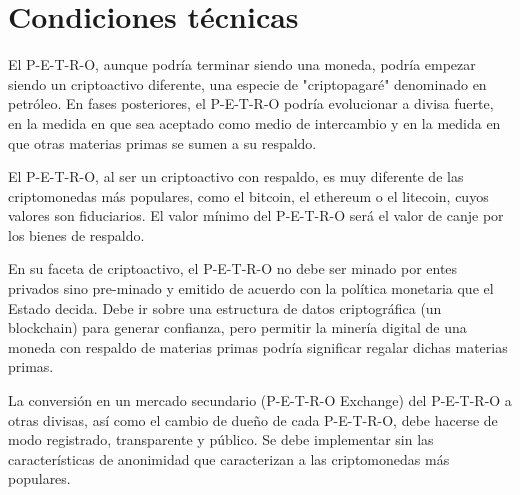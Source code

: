 %
\section{Condiciones técnicas}
\label{sec:annexa}
%
El P-E-T-R-O, aunque podría terminar siendo una moneda, podría empezar siendo un criptoactivo diferente, una especie de "criptopagaré" denominado en petróleo. En fases posteriores, el P-E-T-R-O podría evolucionar a divisa fuerte, en la medida en que sea aceptado como medio de intercambio y en la medida en que otras materias primas se sumen a su respaldo.

El P-E-T-R-O, al ser un criptoactivo con respaldo, es muy diferente de las criptomonedas más populares, como el bitcoin, el ethereum o el litecoin, cuyos valores son fiduciarios. El valor mínimo del P-E-T-R-O será el valor de canje por los bienes de respaldo. 

En su faceta de criptoactivo, el P-E-T-R-O no debe ser minado por entes privados sino pre-minado y emitido de acuerdo con la política monetaria que el Estado decida. Debe ir sobre una estructura de datos criptográfica (un blockchain) para generar confianza, pero permitir la minería digital de una moneda con respaldo de materias primas podría significar regalar dichas materias primas. 

La conversión en un mercado secundario (P-E-T-R-O Exchange) del P-E-T-R-O a otras divisas, así como el cambio de dueño de cada P-E-T-R-O, debe hacerse de modo registrado, transparente y público. Se debe implementar sin las características de anonimidad que caracterizan a las criptomonedas más populares.

